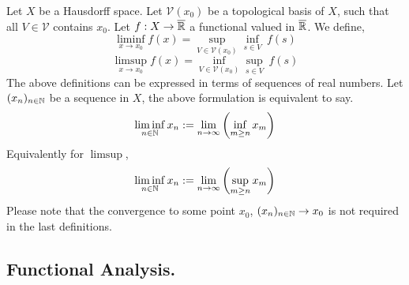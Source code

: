 \begin{definition}
	Let $X$ be a Hausdorff space. Let $\mathcal{V}(x_0)$ be a topological basis of $X$, such that all $V\in \mathcal{V}$ contains $x_0$. Let $f: X\rightarrow \overline{\mathbb{R}}$ a functional valued in $\overline{\mathbb{R}}$. We define, 
	\begin{equation*}
	\liminf_{x\rightarrow x_0} f(x)= \sup_{V\in \mathcal{V}(x_0)} \inf_{s\in V}\ f(s)
	\end{equation*}
	\begin{equation*}
	\limsup_{x\rightarrow x_0} f(x)= \inf_{V\in \mathcal{V}(x_0)} \sup_{s\in V}\ f(s)
	\end{equation*}
	The above definitions can be expressed in terms of sequences of real numbers. Let $(x_n)_{n \in \mathbb{N}}$ be a sequence in $X$, the above formulation is equivalent to say.
	\begin{equation*}
	\liminf_{n\in \mathbb{N}} x_n := \lim_{n\rightarrow \infty} \left( \inf_{m\geq n} x_m \right)
	\end{equation*}
	Equivalently for $\limsup$,
	\begin{equation*}
	\liminf_{n\in \mathbb{N}} x_n := \lim_{n\rightarrow \infty} \left( \sup_{m\geq n} x_m \right)
	\end{equation*}
	Please note that the convergence to some point $x_0$, $(x_n)_{n\in \mathbb{N}}\rightarrow x_0$ is not required in the last definitions.
\end{definition}


\subsection{Functional Analysis.}




\begin{definition}
\end{definition}

\begin{definition}
\end{definition}

\begin{definition}
\end{definition}

\begin{definition}
\end{definition}

